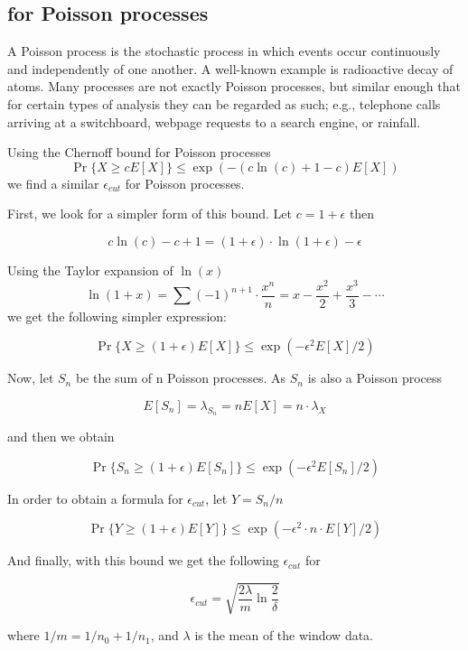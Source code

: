 
\subsection{\adwinz for Poisson processes}
\label{Spoisson}

A Poisson process %
is the stochastic process in which events occur continuously and independently of one another. A well-known example is radioactive decay of atoms. Many processes are not exactly Poisson processes, but similar enough that for certain types of analysis they can be regarded as such; e.g., telephone calls arriving at a switchboard, webpage requests to a search engine, or rainfall.

Using the Chernoff bound for Poisson processes~\cite{mayers02} 
$$
\Pr\{ X \geq cE[X]\} \leq \exp( -( c \ln(c) +1-c) E[X])
$$
we find a similar $\epsilon_{cut}$ for Poisson processes.

First, we look for a simpler form of this bound. Let $c=1 +\epsilon$ then

$$c \ln(c) -c + 1 = ( 1 +\epsilon) \cdot \ln(1+\epsilon) -\epsilon$$

Using the Taylor expansion of $\ln(x)$
   $$\ln(1+x)= \sum (-1)^{n+1} \cdot \frac{x^n}{n} = x -\frac{x^2}{2} + \frac{x^3}{3} - \cdots $$
we get the following simpler expression:

$$\Pr\{ X \geq (1+\epsilon)E[X]\} \leq \exp( -\epsilon^2 E[X] /2)$$

Now, let $S_n$ be the sum of n Poisson processes. As $S_n$ is also a Poisson process

$$E[S_n] =\lambda_{S_n} = n E[X] = n \cdot \lambda_X$$

and then we obtain

$$\Pr\{ S_n \geq (1+\epsilon)E[S_n]\} \leq \exp( -\epsilon^2 E[S_n] /2)$$

In order to obtain a formula for $\epsilon_{cut}$, let $Y=S_n/n$

$$\Pr\{ Y \geq (1+\epsilon)E[Y]\} \leq \exp( -\epsilon^2 \cdot n \cdot E[Y] /2)$$

And finally, with this bound we get the following $\epsilon_{cut}$ for \adwinz

$$\epsilon_{cut} = \sqrt{ \frac{2 \lambda}{m} \ln \frac{2}{\delta}}$$

where $1/m=1/n_0 + 1/n_1$, and $\lambda$ is the mean of the window data.


